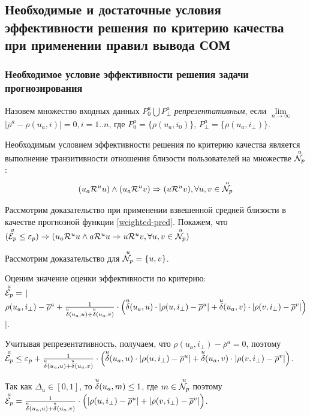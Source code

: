 \subsection{Необходимые и достаточные условия эффективности решения
по критерию качества при применении правил вывода СОМ}

\subsubsection{Необходимое условие эффективности решения задачи прогнозирования}
Назовем множество входных данных $P^a_0 \bigcup P^a_{\bot}$
{\it репрезентативным}, если $\underset{n \rightarrow \infty} {\mathrm{\lim}}$
$|\overline{\rho}^a - \rho(u_a,i)| = 0, i=1..n$, где $P^a_0 = \{\rho(u_a,
i_0)\}$, $P^a_{\bot} = \{\rho(u_a, i_{\bot})\}$.

\begin{trm}
\label{nec-cond-pred-srs}
  Необходимым условием эффективности решения по критерию качества является выполнение
	транзитивности отношения близости пользователей на множестве ${\overset{u}{\mathcal{N}_p}}$:
\begin{equation}	(u_a \mathcal{R}^u u) \wedge (u_a \mathcal{R}^u v) \Rightarrow (u \mathcal{R}^u v), \forall u,v \in {\overset{u}{\mathcal{N}_p}}
\end{equation}
\end{trm}

Рассмотрим доказательство при применении взвешенной средней близости
в качестве прогнозной функции \ref{weighted-pred}.
Покажем, что $({\overset{a}{\mathcal{E}_{p}}} \le \varepsilon_p) \Rightarrow (u_a \mathcal{R}^u u \wedge a
\mathcal{R}^u u  \Rightarrow u \mathcal{R}^u v, \forall u,v \in {\overset{u}{\mathcal{N}_p}})$

Рассмотрим доказательство для ${\overset{u}{\mathcal{N}_p}} = \{u,v\}$.

Оценим значение оценки эффективности по критерию:\\
${\overset{a}{\mathcal{E}_{p}}} = $ $\Bigg|$ $\rho(u_a, i_{\bot}) - \overline{\rho}^a +
\frac{1}{{\overset{u}{\mathcal{\delta}}}(u_a,u) + {\overset{u}{\mathcal{\delta}}}(u_a,v)} \cdot \\
\Big({\overset{u}{\mathcal{\delta}}}(u_a,u) \cdot |\rho(u,i_{\bot}) - \overline{\rho}^u| +
 {\overset{u}{\mathcal{\delta}}}(u_a,v) \cdot |\rho(v,i_{\bot}) - \overline{\rho}^v| \Big)$
 $\Bigg|$.

Учитывая репрезентативность, получаем, что
$\rho(u_a, i_{\bot}) - \overline{\rho}^a = 0$, поэтому\\
${\overset{a}{\mathcal{E}_{p}}} \le \varepsilon_p + \frac{1}{{\overset{u}{\mathcal{\delta}}}(u_a,u) + {\overset{u}{\mathcal{\delta}}}(u_a,v)} \cdot
\Big({\overset{u}{\mathcal{\delta}}}(u_a,u) \cdot |\rho(u,i_{\bot}) - \overline{\rho}^u| +
 {\overset{u}{\mathcal{\delta}}}(u_a,v) \cdot |\rho(v,i_{\bot}) - \overline{\rho}^v|\Big)$.

Так как $\Delta_u \in [0,1]$, то ${\overset{u}{\mathcal{\delta}}}(u_a, m) \le 1$, где $m \in {\overset{u}{\mathcal{N}_p}}$ поэтому\\
${\overset{a}{\mathcal{E}_{p}}} = \frac{1}{{\overset{u}{\mathcal{\delta}}}(u_a,u) + {\overset{u}{\mathcal{\delta}}}(u_a,v)} \cdot
\Big(|\rho(u,i_{\bot}) - \overline{\rho}^u| + |\rho(v,i_{\bot}) - \overline{\rho}^v|\Big)$.

